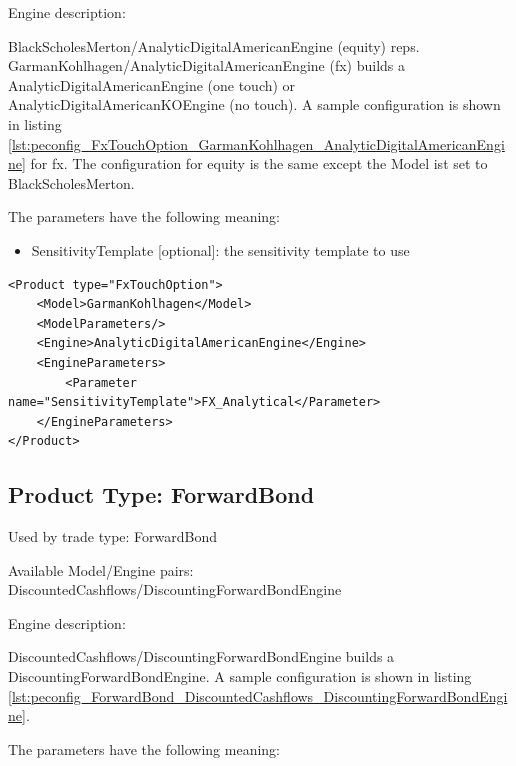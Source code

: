 Engine description:

BlackScholesMerton/AnalyticDigitalAmericanEngine (equity) reps. GarmanKohlhagen/AnalyticDigitalAmericanEngine (fx)
builds a AnalyticDigitalAmericanEngine (one touch) or AnalyticDigitalAmericanKOEngine (no touch). A sample configuration
is shown in listing \ref{lst:peconfig_FxTouchOption_GarmanKohlhagen_AnalyticDigitalAmericanEngine} for fx. The
configuration for equity is the same except the Model ist set to BlackScholesMerton.

The parameters have the following meaning:

\begin{itemize}
\item SensitivityTemplate [optional]: the sensitivity template to use
\end{itemize}

\begin{longlisting}
\begin{verbatim}
<Product type="FxTouchOption">
    <Model>GarmanKohlhagen</Model>
    <ModelParameters/>
    <Engine>AnalyticDigitalAmericanEngine</Engine>
    <EngineParameters>
        <Parameter name="SensitivityTemplate">FX_Analytical</Parameter>
    </EngineParameters>
</Product>
\end{verbatim}
\caption{Configuration for Product FxTouchOption, Model GarmanKohlhagen, Engine AnalyticDigitalAmericanEngine}
\label{lst:peconfig_FxTouchOption_GarmanKohlhagen_AnalyticDigitalAmericanEngine}
\end{longlisting}

\subsection{Product Type: ForwardBond}

Used by trade type: ForwardBond

Available Model/Engine pairs: DiscountedCashflows/DiscountingForwardBondEngine

Engine description:

DiscountedCashflows/DiscountingForwardBondEngine builds a DiscountingForwardBondEngine. A sample configuration is shown
in listing \ref{lst:peconfig_ForwardBond_DiscountedCashflows_DiscountingForwardBondEngine}.

The parameters have the following meaning:

